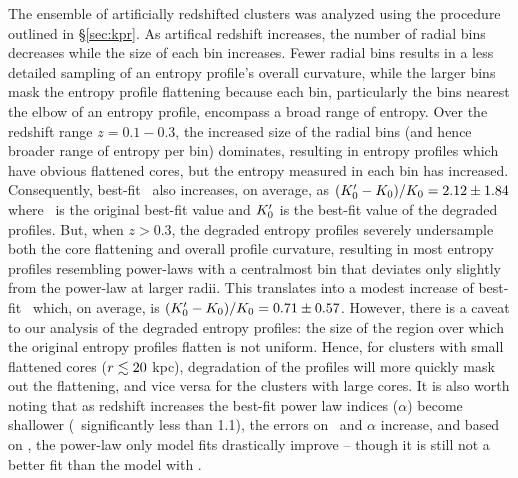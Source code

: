 \documentclass[12pt,preprint]{aastex}
\begin{document}
The ensemble of artificially redshifted clusters was analyzed using
the procedure outlined in \S\ref{sec:kpr}. As artifical redshift
increases, the number of radial bins decreases while the size of each
bin increases. Fewer radial bins results in a less detailed sampling
of an entropy profile's overall curvature, while the larger bins mask
the entropy profile flattening because each bin, particularly the bins
nearest the elbow of an entropy profile, encompass a broad range of
entropy. Over the redshift range $z = 0.1-0.3$, the increased size of
the radial bins (and hence broader range of entropy per bin)
dominates, resulting in entropy profiles which have obvious flattened
cores, but the entropy measured in each bin has
increased. Consequently, best-fit \kna\ also increases, on average, as
$(K_0^{\prime}-K_0)/K_0 = 2.12 \pm 1.84$ where \kna\ is the original best-fit value and
$K_0^{\prime}$ is the best-fit value of the degraded profiles. But,
when $z > 0.3$, the degraded entropy profiles severely undersample
both the core flattening and overall profile curvature, resulting in
most entropy profiles resembling power-laws with a centralmost bin
that deviates only slightly from the power-law at larger radii. This
translates into a modest increase of best-fit \kna\ which, on average,
is $(K_0^{\prime}-K_0)/K_0 = 0.71 \pm 0.57$. However, there is a caveat to our analysis
of the degraded entropy profiles: the size of the region over which
the original entropy profiles flatten is not uniform. Hence, for
clusters with small flattened cores ($r \lesssim 20$ kpc), degradation of
the profiles will more quickly mask out the flattening, and vice versa
for the clusters with large cores. It is also worth noting that as
redshift increases the best-fit power law indices ($\alpha$) become
shallower (\ie\ significantly less than 1.1), the errors on \kna\ and
$\alpha$ increase, and based on \chisq, the power-law only model fits
drastically improve -- though it is still not a better fit than the
model with \kna.
\end{document}
